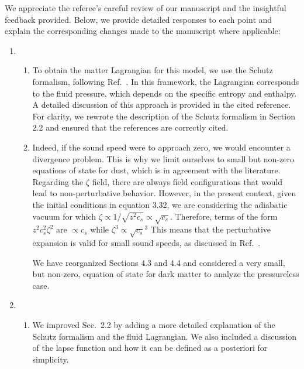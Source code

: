 \documentclass[a4paper,11pt]{article}
\begin{document}
We appreciate the referee’s careful review of our manuscript and the insightful feedback
provided. Below, we provide detailed responses to each point and explain the
corresponding changes made to the manuscript where applicable:

\begin{enumerate}
    \item
          \begin{enumerate}
              \item  To obtain the matter Lagrangian for this model, we use the Schutz
                    formalism, following Ref.~\cite{fluidgeral}. In this framework, the
                    Lagrangian corresponds to the fluid pressure, which depends on the
                    specific entropy and enthalpy. A detailed discussion of this
                    approach is provided in the cited reference. For clarity, we rewrote
                    the description of the Schutz formalism in Section 2.2 and ensured
                    that the references are correctly cited.

              \item Indeed, if the sound speed were to approach zero, we would encounter
                    a divergence problem. This is why we limit ourselves to small but
                    non-zero equations of state for dust, which is in agreement with the
                    literature. Regarding the $\zeta$ field, there are always field
                    configurations that would lead to non-perturbative behavior.
                    However, in the present context, given the initial conditions in
                    equation 3.32, we are considering the adiabatic vacuum for which
                    $\zeta \propto 1/\sqrt{z^2c_s} \propto \sqrt{c_s}$. Therefore, terms
                    of the form $z^2c_s^2\zeta^2$ are $\propto c_s$ while $\zeta^3
                        \propto \sqrt{c_s}^3$ This means that the perturbative expansion is valid
                    for small sound speeds, as discussed in
                    Ref.~\cite{vitenti2012large}.

                    We have reorganized Sections 4.3 and 4.4 and considered a very
                    small, but non-zero, equation of state for dark matter to analyze
                    the pressureless case.
          \end{enumerate}

    \item

          \begin{enumerate}
              \item We improved Sec.~2.2 by adding a more detailed explanation of the
                    Schutz formalism and the fluid Lagrangian. We also included a
                    discussion of the lapse function and how it can be defined as a
                    posteriori for simplicity.


\end{enumerate}
\end{enumerate}
\end{document}
